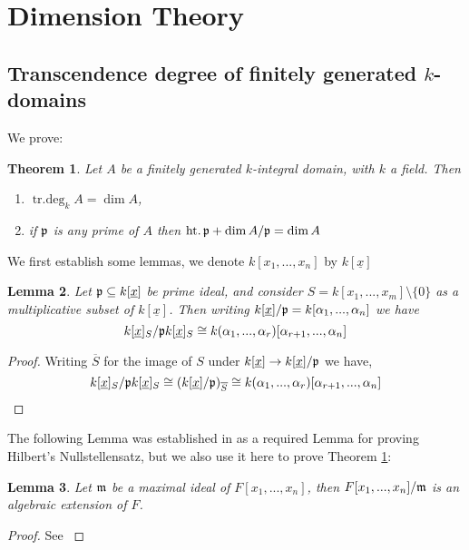 \documentclass[12pt]{article}
\theoremstyle{plain}
\newtheorem{thm}{Theorem}[subsection] %
\newtheorem{lemma}[thm]{Lemma}
\theoremstyle{definition}
\begin{document}
	\section{Dimension Theory}
	\subsection{Transcendence degree of finitely generated $k$-domains}
	We prove:
	\begin{thm}
		\label{thm:onepointeight}
		Let $A$ be a finitely generated $k$-integral domain, with $k$ a field. Then
		\begin{enumerate}
			\item\label{thm:onepointeighta} $\operatorname{tr.deg}_kA = \operatorname{dim}A$,
			\item\label{thm:onepointeightb} if $\frak{p}$ is any prime of $A$ then $\operatorname{ht.}\frak{p} + \operatorname{dim}A/\frak{p} = \operatorname{dim}A$
		\end{enumerate}
	\end{thm}
	We first establish some lemmas, we denote $k[x_1,...,x_n]$ by $k[\underline{x}]$
	\begin{lemma}
		\label{lem:notationdance}
		Let $\frak{p} \subseteq k[\underline{x}]$ be prime ideal, and consider $S = k[x_1,...,x_m]\setminus\lbrace 0 \rbrace$ as a multiplicative subset of $k[\underline{x}]$. Then writing $k[\underline{x}]/\frak{p} = k[\alpha_1,...,\alpha_n]$ we have
		\[k[\underline{x}]_S/\frak{p}k[\underline{x}]_S \cong k(\alpha_1,...,\alpha_r)[\alpha_{r+1},...,\alpha_n]\]
	\end{lemma}
	\begin{proof}
		Writing $\overline{S}$ for the image of $S$ under $k[\underline{x}] \to k[\underline{x}]/\frak{p}$ we have,
		\[k[\underline{x}]_S/\frak{p}k[\underline{x}]_S \cong (k[\underline{x}]/\frak{p})_{\overline{S}} \cong k(\alpha_1,...,\alpha_r)[\alpha_{r+1},...,\alpha_n]\]
	\end{proof}
	The following Lemma was established in \cite{com_alg_notes} as a required Lemma for proving Hilbert's Nullstellensatz, but we also use it here to prove Theorem \ref{thm:onepointeight}:
	\begin{lemma}
		\label{lem:algebraic}
		Let $\frak{m}$ be a maximal ideal of $F[x_1,...,x_n]$, then $F[x_1,...,x_n]/\frak{m}$ is an algebraic extension of $F$.
	\end{lemma}
	\begin{proof}
		See \cite[\S 2.1]{com_alg_notes}
	\end{proof}
\end{document}
